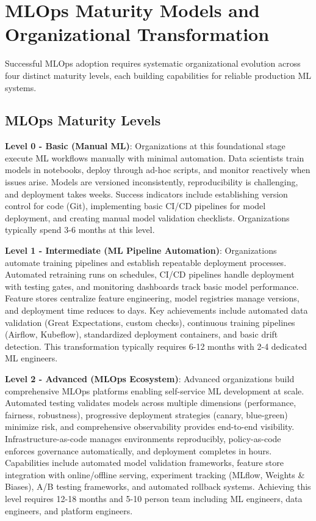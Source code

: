 \section{MLOps Maturity Models and Organizational Transformation}

Successful MLOps adoption requires systematic organizational evolution across four distinct maturity levels, each building capabilities for reliable production ML systems.

\subsection{MLOps Maturity Levels}

\textbf{Level 0 - Basic (Manual ML)}: Organizations at this foundational stage execute ML workflows manually with minimal automation. Data scientists train models in notebooks, deploy through ad-hoc scripts, and monitor reactively when issues arise. Models are versioned inconsistently, reproducibility is challenging, and deployment takes weeks. Success indicators include establishing version control for code (Git), implementing basic CI/CD pipelines for model deployment, and creating manual model validation checklists. Organizations typically spend 3-6 months at this level.

\textbf{Level 1 - Intermediate (ML Pipeline Automation)}: Organizations automate training pipelines and establish repeatable deployment processes. Automated retraining runs on schedules, CI/CD pipelines handle deployment with testing gates, and monitoring dashboards track basic model performance. Feature stores centralize feature engineering, model registries manage versions, and deployment time reduces to days. Key achievements include automated data validation (Great Expectations, custom checks), continuous training pipelines (Airflow, Kubeflow), standardized deployment containers, and basic drift detection. This transformation typically requires 6-12 months with 2-4 dedicated ML engineers.

\textbf{Level 2 - Advanced (MLOps Ecosystem)}: Advanced organizations build comprehensive MLOps platforms enabling self-service ML development at scale. Automated testing validates models across multiple dimensions (performance, fairness, robustness), progressive deployment strategies (canary, blue-green) minimize risk, and comprehensive observability provides end-to-end visibility. Infrastructure-as-code manages environments reproducibly, policy-as-code enforces governance automatically, and deployment completes in hours. Capabilities include automated model validation frameworks, feature store integration with online/offline serving, experiment tracking (MLflow, Weights \& Biases), A/B testing frameworks, and automated rollback systems. Achieving this level requires 12-18 months and 5-10 person team including ML engineers, data engineers, and platform engineers.

